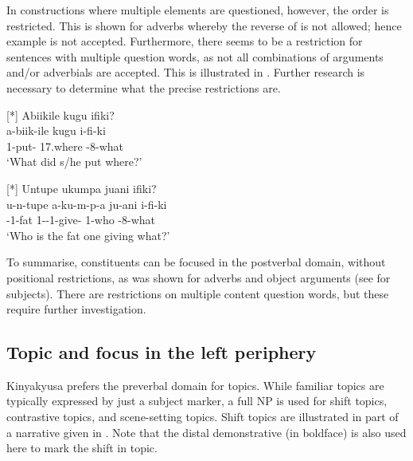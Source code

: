 \documentclass[output=paper]{langscibook}
\begin{document}
\z
\z


In constructions where multiple elements are questioned, however, the order is restricted. This is shown for adverbs whereby the reverse of  is not allowed; hence example  is not accepted. Furthermore, there seems to be a restriction for sentences with multiple question words, as not all combinations of arguments and/or adverbials are accepted. This is illustrated in . Further research is necessary to determine what the precise restrictions are.

\ea
\label{bkm:Ref136343872}
\ea
[*]{
\label{bkm:Ref136343872:a}
Abiikile kugu ifiki?\\
\gll
a-biik-ile  kugu  i-fi-ki\\
1\SM{}-put-\PFV{}  17.where  \AUG{}-8-what\\
\glt
‘What did s/he put where?’\\
}

\ex
[*]{
\label{bkm:Ref136343872:b}
Untupe ukumpa juani ifiki?\\
\gll
u-n-tupe  a-ku-m-p-a  ju-ani  i-fi-ki\\
\AUG{}-1-fat  1\SM{}-\PRS{}-1\OM{}-give-\FV{}  1-who  \AUG{}-8-what\\
\glt
‘Who is the fat one giving what?’\\
}

\z
\z


To summarise, constituents can be focused in the postverbal domain, without positional restrictions, as was shown for adverbs and object arguments (see  for subjects). There are restrictions on multiple content question words, but these require further investigation.

\subsection{Topic and focus in the left periphery}
\label{bkm:Ref114653225}
Kinyakyusa prefers the preverbal domain for topics. While familiar topics are typically expressed by just a subject marker, a full NP is used for shift topics, contrastive topics, and scene-setting topics. Shift topics are illustrated in part of a narrative given in . Note that the distal demonstrative (in boldface) is also used here to mark the shift in topic.\largerpage[-1]\pagebreak
\end{document}
